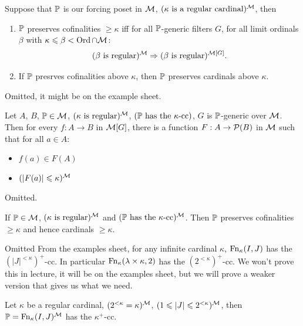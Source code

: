 \documentclass{article}
\begin{document}
    \begin{fancylem}{}
        Suppose that $\mathbb{P}$ is our forcing poset in $\mathcal{M}$, $(\kappa \text{ is a regular cardinal})^{\mathcal{M}}$, then \begin{enumerate}
            \item[(i)] $\mathbb{P}$ preserves cofinalities $\geq \kappa$ iff for all $\mathbb{P}$-generic filters $G$, for all limit ordinals $\beta$ with $\kappa \leqslant \beta < \operatorname{Ord} \cap \mathcal{M}$: \[ (\beta \text{ is regular})^{\mathcal{M}} \Rightarrow (\beta \text{ is regular})^{\mathcal{M}[G]}.\]
            \item[(ii)] If $\mathbb{P}$ presrves cofinalities above $\kappa$, then $\mathbb{P}$ preserves cardinals above $\kappa$.
        \end{enumerate}
    \end{fancylem}
    \proof Omitted, it might be on the example sheet. \endproof
    \begin{fancylem}{}
        Let $A$, $B$, $\mathbb{P} \in \mathcal{M}$, $(\kappa \text{ is regular})^{\mathcal{M}}$, $(\mathbb{P} \text{ has the $\kappa$-cc})$, $G$ is $\mathbb{P}$-generic over $\mathcal{M}$. Then for every $f: A \to B$ in $\mathcal{M}[G]$, there is a function $F : A \to \mathcal{P}(B)$ in $\mathcal{M}$ such that for all $a \in A$: \begin{itemize}
            \item $f(a) \in F(A)$
            \item $(|F(a)|\leqslant \kappa)^{\mathcal{M}}$
        \end{itemize}
    \end{fancylem}
    \proof Omitted. \endproof
    \begin{fancythm}{}
        If $\mathbb{P} \in \mathcal{M}$, $(\kappa \text{ is regular})^{\mathcal{M}}$ and $(\mathbb{P} \text{ has the $\kappa$-cc})^{\mathcal{M}}$. Then $\mathbb{P}$ preserves cofinalities $\geq \kappa$ and hence cardinals $\geq \kappa$.
    \end{fancythm}
    \proof Omitted \endproof
    From the examples sheet, for any infinite cardinal $\kappa$, $\operatorname{Fn}_{\kappa}(I,J)$ has the $(|J|^{<\kappa})^{+}$-cc. In particular $\operatorname{Fn}_{\kappa}(\lambda \times \kappa, 2)$ has the $(2^{<\kappa})^{+}$-cc. We won't prove this in lecture, it will be on the examples sheet, but we will prove a weaker version that gives us what we need.
    \begin{fancylem}{}
        Let $\kappa$ be a regular cardinal, $(2^{<\kappa} = \kappa)^{\mathcal{M}}$, $(1 \leqslant |J| \leqslant 2^{<\kappa})^{\mathcal{M}}$, then $\mathbb{P} = \operatorname{Fn}_{\kappa}(I,J)^{\mathcal{M}}$ has the $\kappa^{+}$-cc.
    \end{fancylem}
\end{document}
